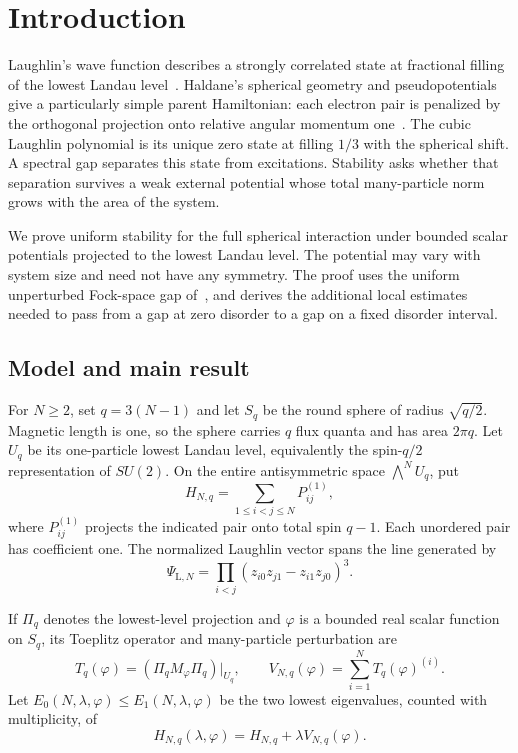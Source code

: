 \section{Introduction}\label{sec:introduction}

Laughlin's wave function describes a strongly correlated state at
fractional filling of the lowest Landau level~\cite{Laughlin}.
Haldane's spherical geometry and pseudopotentials give a particularly
simple parent Hamiltonian: each electron pair is penalized by the
orthogonal projection onto relative angular momentum one~\cite{Haldane}.
The cubic Laughlin polynomial is its unique zero state at filling
$1/3$ with the spherical shift. A spectral gap separates this state
from excitations. Stability asks whether that separation survives
a weak external potential whose total many-particle norm grows with
the area of the system.

We prove uniform stability for the full spherical interaction under
bounded scalar potentials projected to the lowest Landau level.
The potential may vary with system size and need not have any symmetry.
The proof uses the uniform unperturbed Fock-space gap of~\cite{Gap},
and derives the additional local estimates needed to pass from a
gap at zero disorder to a gap on a fixed disorder interval.

\subsection{Model and main result}

For $N\ge2$, set $q=3(N-1)$ and let $S_q$ be the round sphere of
radius $\sqrt{q/2}$. Magnetic length is one, so the sphere carries
$q$ flux quanta and has area $2\pi q$. Let $U_q$ be its one-particle
lowest Landau level, equivalently the spin-$q/2$ representation of
$SU(2)$. On the entire antisymmetric space $\bigwedge^N U_q$, put
\begin{equation}\label{eq:intro-H}
 H_{N,q}=\sum_{1\le i<j\le N}P_{ij}^{(1)},
\end{equation}
where $P_{ij}^{(1)}$ projects the indicated pair onto total spin
$q-1$. Each unordered pair has coefficient one. The normalized
Laughlin vector spans the line generated by
\begin{equation}\label{eq:intro-laughlin}
 \Psi_{\mathrm L,N}=\prod_{i<j}
       (z_{i0}z_{j1}-z_{i1}z_{j0})^3.
\end{equation}

If $\Pi_q$ denotes the lowest-level projection and $\varphi$ is a
bounded real scalar function on $S_q$, its Toeplitz operator and
many-particle perturbation are
\[
 T_q(\varphi)=(\Pi_qM_\varphi\Pi_q)|_{U_q},\qquad
 V_{N,q}(\varphi)=\sum_{i=1}^N T_q(\varphi)^{(i)}.
\]
Let $E_0(N,\lambda,\varphi)\le E_1(N,\lambda,\varphi)$ be the
two lowest eigenvalues, counted with multiplicity, of
\[
 H_{N,q}(\lambda,\varphi)=H_{N,q}+\lambda V_{N,q}(\varphi).
\]

